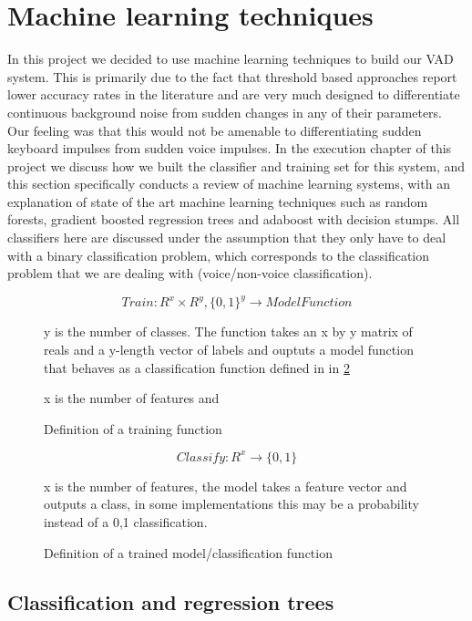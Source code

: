 \documentclass[ %
                    author={Sam Phippen},
                supervisor={Dr. Rafal Bogacz},
                     title={Real time voice activity detectors in noisy personal computing environments},
                  subtitle={},
                    degree={MEng},
                      year={2012} ]{thesis}
\begin{document}
\section{Machine learning techniques}

In this project we decided to use machine learning techniques to build our VAD
system. This is primarily due to the fact that threshold based approaches
report lower accuracy rates in the literature and are very much designed to
differentiate continuous background noise from sudden changes in any of their
parameters. Our feeling was that this would not be amenable to differentiating
sudden keyboard impulses from sudden voice impulses. In the execution chapter
of this project we discuss how we built the classifier and training set for
this system, and this section specifically conducts a review of machine
learning systems, with an explanation of state of the art machine learning
techniques such as random forests, gradient boosted regression trees and
adaboost with decision stumps. All classifiers here are discussed under the
assumption that they only have to deal with a binary classification problem,
which corresponds to the classification problem that we are dealing with
(voice/non-voice classification).

\begin{figure}
    $$Train:R^x \times R^y, \{0,1\}^y \rightarrow ModelFunction$$

    y is the number of classes. The function takes an x by y matrix of reals
    and a y-length vector of labels and ouptuts a model function that behaves
    as a classification function defined in in \ref{eqn:define-classify}

    \caption{Definition of a training function} x is the number of features and

    \label{eqn:define-train}
\end{figure}

\begin{figure}
    $$Classify: R^x \rightarrow \{0,1\}$$

    x is the number of features, the model takes a feature vector and outputs a
    class, in some implementations this may be a probability instead of a {0,1}
    classification.

    \caption{Definition of a trained model/classification function}

    \label{eqn:define-classify}
\end{figure}

\subsection{Classification and regression trees}
\end{document}
